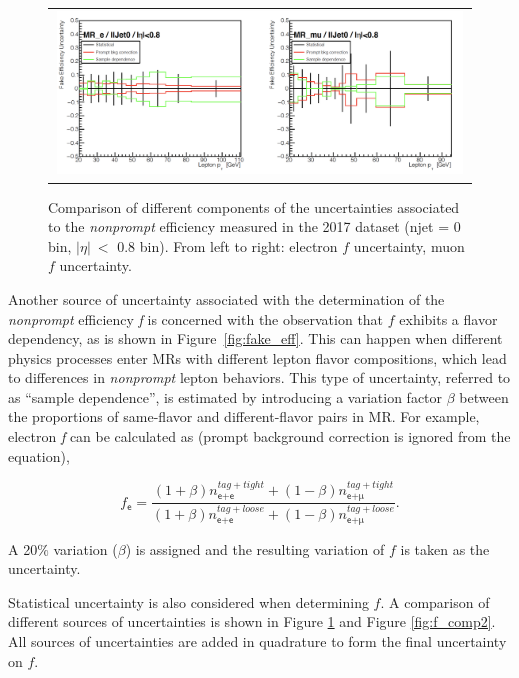 \begin{figure}[tbh!]
 \begin{center}
 \begin{tabular}{c}
 \includegraphics[width=0.99\textwidth]{figures/Part3/Systematics/MR1}
 \end{tabular}
 \caption{Comparison of different components of the uncertainties associated to the \emph{nonprompt} efficiency measured in the 2017 dataset (njet = 0 bin, $|\eta|~<$ 0.8 bin). From left to right: electron $f$ uncertainty, muon $f$ uncertainty.}
 \label{fig:f_comp1}
 \end{center}
\end{figure}

Another source of uncertainty associated with the determination of the \emph{nonprompt} efficiency \emph{f} is concerned with the observation that $f$ exhibits a flavor dependency, as is shown in Figure~\ref{fig:fake_eff}. This can happen when different physics processes enter \acp{MR} with different lepton flavor compositions, which lead to differences in \emph{nonprompt} lepton behaviors. This type of uncertainty, referred to as ``sample dependence'', is estimated by introducing a variation factor $\beta$ between the proportions of same-flavor and different-flavor pairs in \ac{MR}. For example, electron \emph{f} can be calculated as (prompt background correction is ignored from the equation),

\begin{equation}
f_{\textsf{e}}=\frac{(1+\beta)n_{\textsf{e+e}}^{tag+tight}+(1-\beta)n_{\textsf{e+}\upmu}^{tag+tight}}{(1+\beta)n_{\textsf{e+e}}^{tag+loose}+(1-\beta)n_{\textsf{e+}\upmu}^{tag+loose}}.
 \label{eq:samp_dep}
\end{equation}

A 20$\%$ variation ($\beta$) is assigned and the resulting variation of $f$ is taken as the uncertainty.
 
Statistical uncertainty is also considered when determining $f$. A comparison of different sources of uncertainties is shown in Figure \ref{fig:f_comp1} and Figure \ref{fig:f_comp2}. All sources of uncertainties are added in quadrature to form the final uncertainty on $f$. 

